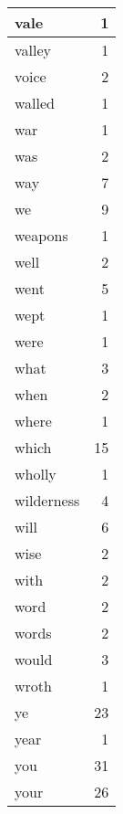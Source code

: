 \begin{center}
\begin{longtable}{l|r}
vale & 1 \\ \hline
valley & 1 \\ \hline
voice & 2 \\ \hline
walled & 1 \\ \hline
war & 1 \\ \hline
was & 2 \\ \hline
way & 7 \\ \hline
we & 9 \\ \hline
weapons & 1 \\ \hline
well & 2 \\ \hline
went & 5 \\ \hline
wept & 1 \\ \hline
were & 1 \\ \hline
what & 3 \\ \hline
when & 2 \\ \hline
where & 1 \\ \hline
which & 15 \\ \hline
wholly & 1 \\ \hline
wilderness & 4 \\ \hline
will & 6 \\ \hline
wise & 2 \\ \hline
with & 2 \\ \hline
word & 2 \\ \hline
words & 2 \\ \hline
would & 3 \\ \hline
wroth & 1 \\ \hline
ye & 23 \\ \hline
year & 1 \\ \hline
you & 31 \\ \hline
your & 26 \\ \hline
\end{longtable}
\end{center}



\normalsize



